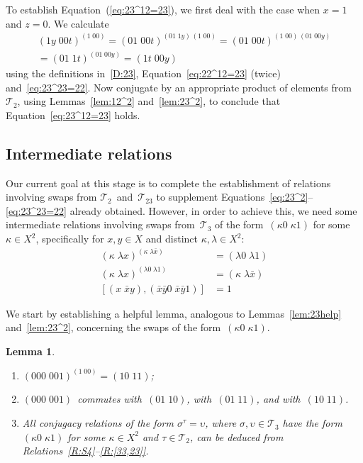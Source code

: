 \documentclass[a4paper,11pt]{article}
\numberwithin{equation}{section}
\newcommand{\eqstate}[1]{Equation~(\ref{#1})}
\newcommand{\swap}[2]{(#1\;#2)}
\newcommand{\Sw}[1]{\mathcal{T}_{#1}}
\newtheorem{lemma}[thm]{Lemma}
\begin{document}
To establish \eqstate{eq:23^12=23}, we first deal with the case when
$x = 1$ and $z = 0$.  We calculate
\begin{multline*}
  \swap{1y}{00t}^{\swap{1}{00}}
  = \swap{01}{00t}^{\swap{01}{1y} \, \swap{1}{00}}
  = \swap{01}{00t}^{\swap{1}{00} \, \swap{01}{00y}} \\
  = \swap{01}{1t}^{\swap{01}{00y}}
  = \swap{1t}{00y}
\end{multline*}
using the definitions in~\eqref{D:23}, Equation~\eqref{eq:22^12=23}
(twice) and~\eqref{eq:23^23=22}.  Now conjugate by an appropriate
product of elements from~$\Sw{2}$, using Lemmas~\ref{lem:12^2}
and~\ref{lem:23^2}, to conclude that Equation~\eqref{eq:23^12=23}
holds.

\subsection{Intermediate relations}

Our current goal at this stage is to complete the establishment of
relations involving swaps from $\Sw{2}$~and~$\Sw{23}$ to supplement
Equations~\eqref{eq:23^2}--\eqref{eq:23^23=22} already obtained.
However, in order to achieve this, we need some intermediate relations
involving swaps from~$\Sw{3}$ of the form~$\swap{\kappa0}{\kappa1}$
for some $\kappa \in X^{2}$, specifically for $x,y \in X$ and distinct
$\kappa,\lambda \in X^{2}$:
\begin{align}
  \swap{\kappa}{\lambda x}^{\swap{\kappa}{\lambda\bar{x}}} &=
  \swap{\lambda0}{\lambda1}
  \label{eq:23^23=k01}
  \\
  \swap{\kappa}{\lambda x}^{\swap{\lambda0}{\lambda1}} &=
  \swap{\kappa}{\lambda\bar{x}}
  \label{eq:23^k01=23}
  \\
  [ \swap{x}{\bar{x}y} , \swap{\bar{x}\bar{y}0}{\bar{x}\bar{y}1} ] &=
  1
  \label{eq:[12,k01]}
\end{align}

We start by establishing a helpful lemma, analogous to
Lemmas~\ref{lem:23help} and~\ref{lem:23^2}, concerning the swaps of
the form~$\swap{\kappa0}{\kappa1}$.

\begin{lemma}
  \label{lem:k01help}
  \begin{enumerate}
  \item
    \label{(000,001)-shrink}
    $\swap{000}{001}^{\swap{1}{00}} = \swap{10}{11}$;
  \item
    \label{(000,001)-commute}
    $\swap{000}{001}$~commutes with~$\swap{01}{10}$,
    with~$\swap{01}{11}$, and with~$\swap{10}{11}$.
  \item
    \label{k01^2}
    All conjugacy relations of the form $\sigma^{\tau} = \upsilon$,
    where $\sigma,\upsilon \in \Sw{3}$ have the
    form~$\swap{\kappa0}{\kappa1}$ for some $\kappa \in X^{2}$ and
    $\tau \in \Sw{2}$, can be deduced from
    Relations~\ref{R:S4}--\ref{R:[33,23]}.
  \end{enumerate}
\end{lemma}
\end{document}

